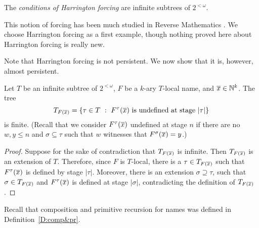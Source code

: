 The \textit{conditions of Harrington forcing} are infinite subtrees of $2^{<\omega}$.

This notion of forcing has been much studied in Reverse Mathematics \cite{SOSOA}.
We choose Harrington forcing as a first example, though nothing
proved here about Harrington forcing is really new.

Note that Harrington forcing is not persistent.
We now show that it is, however, almost persistent.

\begin{lem}[\RCAo]\label{L:H:locallem}
Let $T$ be an infinite subtree of $2^{<\omega}$,
$F$ be a $k$-ary $T$-local name, and $\overline{x}\in\mathbb{N}^k$.
The tree
$$T_{F(\overline{x})}=\left\{\tau\in T\ :\ F^\tau(\overline{x})\text{ is undefined at stage }|\tau|\right\}$$
is finite.
(Recall that we consider $F^\tau(\overline{x})$ undefined at stage $n$ if
there are no $w,y\leq n$ and $\sigma\subseteq\tau$
such that $w$ witnesses that $F^\sigma(\overline{x})=y$.)
\end{lem}
\begin{proof}
Suppose for the sake of contradiction that $T_{F(\overline{x})}$ is infinite.
Then $T_{F(\overline{x})}$ is an extension of $T$.
Therefore, since $F$ is $T$-local, there is a $\tau\in T_{F(\overline{x})}$
such that $F^\tau(\overline{x})$ is defined by stage $|\tau|$.
Moreover, there is an extension $\sigma\supseteq\tau$, such that
$\sigma\in T_{F(\overline{x})}$ and $F^\tau(\overline{x})$ is defined at stage $|\sigma|$,
contradicting the definition of $T_{F(\overline{x})}$.
\end{proof}

Recall that composition and primitive recursion for names
was defined in Definition~\ref{D:comp&pr}.

